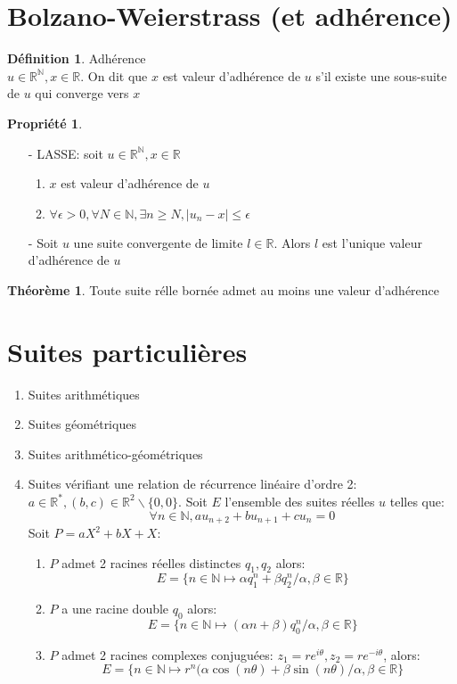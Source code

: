 \documentclass[fleqn]{article}
\theoremstyle{definition} \newtheorem*{defi}{D\'efinition}
\theoremstyle{definition} \newtheorem*{theo}{Th\'eor\`eme}
\theoremstyle{definition} \newtheorem*{prop}{Propri\'et\'e}
\theoremstyle{definition} \newtheorem*{coro}{Corollaire}
\theoremstyle{remark} \newtheorem*{rqs}{Remarque}
\begin{document}
\section{Bolzano-Weierstrass (et adh\'erence)}
\begin{defi} Adh\'erence \\
	$u \in \mathbb{R}^\mathbb{N}, x \in \mathbb{R}$.  On dit que $x$ est valeur d'adh\'erence de $u$ s'il existe une sous-suite de $u$
	qui converge vers $x$
\end{defi}
\begin{prop} $ $
	\begin{itemize}
		\item [-] LASSE: soit $u \in \mathbb{R}^\mathbb{N}, x \in \mathbb{R}$
		\begin{enumerate}
			\item $x$ est valeur d'adh\'erence de $u$
			\item $\forall \epsilon > 0, \forall N \in \mathbb{N}, \exists n \geq N, |u_n - x| \leq \epsilon$
		\end{enumerate}
		\item [-] Soit $u$ une suite convergente de limite $l \in \mathbb{R}$. Alors $l$ est l'unique valeur d'adh\'erence de $u$
	\end{itemize}
\end{prop}

\begin{theo}
	Toute suite r\'elle born\'ee admet au moins une valeur d'adh\'erence
\end{theo}

\section{Suites particuli\`eres}
\begin{enumerate}
	\item Suites arithm\'etiques
	\item Suites g\'eom\'etriques
	\item Suites arithm\'etico-g\'eom\'etriques
	\item Suites v\'erifiant une relation de r\'ecurrence lin\'eaire d'ordre 2: \\
		$a \in \mathbb{R}^*, (b,c) \in \mathbb{R}^2\backslash\{0,0\}$. Soit $E$ l'ensemble des suites r\'eelles $u$ telles que:
		\[\forall n \in \mathbb{N}, au_{n+2} + bu_{n+1} + cu_n = 0\]
		Soit $P = aX^2 + bX + X$:
		\begin{enumerate}
			\item $P$ admet 2 racines r\'eelles distinctes $q_1, q_2$ alors:
				\[E = \{n \in \mathbb{N} \mapsto \alpha q_1^n + \beta q_2^n / \alpha, \beta \in \mathbb{R}\}\]
			\item $P$ a une racine double $q_0$ alors:
				\[E = \{n \in \mathbb{N} \mapsto (\alpha n + \beta) q_0^n / \alpha, \beta \in \mathbb{R}\}\]
			\item $P$ admet 2 racines complexes conjugu\'ees: $z_1 = re^{i\theta}, z_2 = re^{-i\theta}$, alors:
				\[E = \{n \in \mathbb{N} \mapsto r^n(\alpha \cos(n\theta) + \beta \sin(n\theta) / \alpha, \beta \in \mathbb{R}\}\]
		\end{enumerate}
\end{enumerate}
\end{document}
